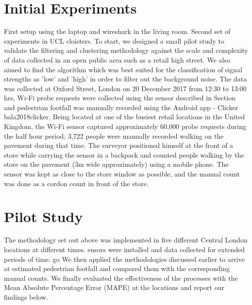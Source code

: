 \section{Initial Experiments}

First setup using the laptop and wireshark in the living room.
Second set of experiments in UCL cloisters.
To start, we designed a small pilot study to validate the filtering and clustering methodology against the scale and complexity of data collected in an open public area such as a retail high street.
We also aimed to find the algorithm which was best suited for the classification of signal strengths as 'low' and 'high' in order to filter out the background noise.
The data was collected at Oxford Street, London on 20 December 2017 from 12:30 to 13:00 hrs, Wi-Fi probe requests were collected using the sensor described in Section and pedestrian footfall was manually recorded using the Android app - Clicker bala2018clicker.
Being located at one of the busiest retail locations in the United Kingdom, the Wi-Fi sensor captured approximately 60,000 probe requests during the half hour period; 3,722 people were manually recorded walking on the pavement during that time.
The surveyor positioned himself at the front of a store while carrying the sensor in a backpack and counted people walking by the store on the pavement (3m wide approximately) using a mobile phone.
The sensor was kept as close to the store window as possible, and the manual count was done as a cordon count in front of the store.

\section{Pilot Study}

The methodology set out above was implemented in five different Central London locations at different times.
ensors were installed and data collected for extended periods of time.
go
We then applied the methodologies discussed earlier to arrive at estimated pedestrian footfall and compared them with the corresponding manual counts.
We finally evaluated the effectiveness of the processes with the Mean Absolute Percentage Error (MAPE) at the locations and report our findings below.


